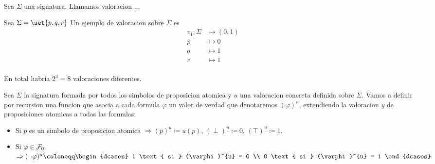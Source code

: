 \begin{definition}
	Sea \(\Sigma \) una signatura. Llamamos valoracion ...
\end{definition}

\begin{example}
	Sea \(\Sigma = \set{p,q,r }\) Un ejemplo de valoracion sobre \(\Sigma \) es
	\[
		\begin{aligned}
			v_1 \colon \Sigma & \longrightarrow (0,1) \\
			p                 & \longmapsto  0        \\
			q                 & \longmapsto  1        \\
			r                 & \longmapsto  1        \\
		\end{aligned}
	\]

\end{example}
\begin{remark}
	En total habria \(2^{3 } = 8 \) valoraciones diferentes.
\end{remark}

\begin{definition}
	Sea \(\Sigma \) la signatura formada por todos los simbolos de proposicion atomica y \(u \) una valoracion concreta definida sobre \(\Sigma \). Vamos a definir por recursion una funcion que asocia a cada formula \(\varphi \) un valor de verdad que denotaremos \((\varphi)^{u} \), extendiendo la valoracion \(y \) de proposiciones atomicas a todas las formulas:
	\begin{itemize}
		\item Si \(p \) es un simbolo de proposicion atomica \(\Rightarrow (p)^{u} \coloneqq u(p) \), \((\perp)^u \coloneqq 0\), \((\top)^{u} \coloneqq 1 \).
		\item Si \(\varphi \in \mathcal{\MakeUppercase{f}}_0 \) \(\Rightarrow (\neg \varphi)^{u} \coloneqq \begin{dcases}
			      1 \text{ si } (\varphi)^{u} = 0 \\
			      0 \text{ si } (\varphi)^{u} = 1
		      \end{dcases} \)
	\end{itemize}
\end{definition}

